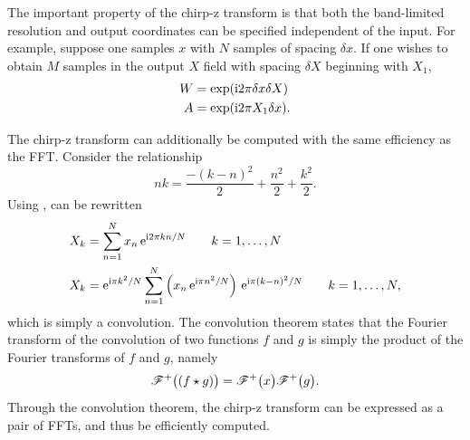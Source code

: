 The important property of the chirp-z transform is that both the
band-limited resolution and output coordinates can be specified independent of the input.
For example, suppose one samples $x$ with $N$ samples
of spacing $\delta x$.  If one wishes to obtain $M$ samples in the output
$X$ field with spacing $\delta X$ beginning with $X_1$, 
\begin{align}
								W&=\exp({\mathrm{i}} 2 \pi \delta x \delta X)\\
								A&=\exp({\mathrm{i}} 2 \pi X_1 \delta x).
\end{align}

The chirp-z transform can additionally be computed with the same efficiency
as the FFT.  Consider the relationship
\begin{equation}
n k = \frac{-(k-n)^2}{2} + \frac{n^2}{2} + \frac{k^2}{2}.
\label{eqn:relationshipfargodingus}
\end{equation}
Using ,  can be rewritten
\begin{align}
								X_k &= \sum_{n=1}^{N} x_n\, {\mathrm{e}}^{{\mathrm{i}} 2\pi k n/N} \qquad k=1,\ldots,N\\
								X_k &= {\mathrm{e}}^{{\mathrm{i}} \pi k^2/N} \sum_{n=1}^{N} \left(x_n\, {\mathrm{e}}^{{\mathrm{i}} \pi n^2/N}\right)\,
								{\mathrm{e}}^{{\mathrm{i}} \pi(k-n)^2/N}\qquad k=1,\ldots,N,
\end{align}
which is simply a convolution.  The convolution theorem 
states that the Fourier transform of the
convolution of two functions $f$ and $g$ is simply the product of the
Fourier transforms of $f$ and $g$, namely
\begin{equation}
{\mathscr{F}^{+}\bigl(\left(f \star g\right)\bigr)} = {\mathscr{F}^{+}\bigl(x\bigr)}{\mathscr{F}^{+}\bigl(g\bigr)}.
\end{equation}
Through the convolution theorem, the chirp-z transform can be expressed as
a pair of FFTs, and thus be efficiently computed.

